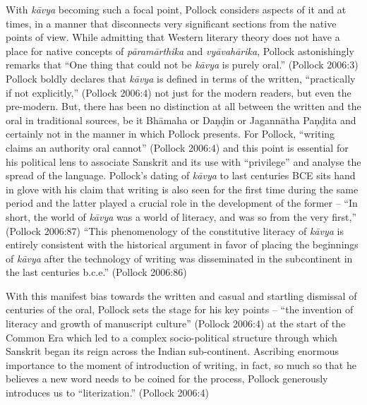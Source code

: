 With \textit{kāvya} becoming such a focal point, Pollock considers aspects of it and at times, in a manner that disconnects very significant sections from the native points of view. While admitting that Western literary theory does not have a place for native concepts of \textit{pāramārthika} and \textit{vyāvahārika}, Pollock astonishingly remarks that “One thing that could not be \textit{kāvya} is purely oral.” (Pollock 2006:3) Pollock boldly declares that \textit{kāvya} is defined in terms of the written, “practically if not explicitly,” (Pollock 2006:4) not just for the modern readers, but even the pre-modern. But, there has been no distinction at all between the written and the oral in traditional sources, be it Bhāmaha or Daṇḍin or Jagannātha Paṇḍita and certainly not in the manner in which Pollock presents. For Pollock, “writing claims an authority oral cannot” (Pollock 2006:4) and this point is essential for his political lens to associate Sanskrit and its use with “privilege” and analyse the spread of the language. Pollock’s dating of \textit{kāvya} to last centuries BCE sits hand in glove with his claim that writing is also seen for the first time during the same period and the latter played a crucial role in the development of the former – “In short, the world of \textit{kāvya} was a world of literacy, and was so from the very first,” (Pollock 2006:87) “This phenomenology of the constitutive literacy of \textit{kāvya} is entirely consistent with the historical argument in favor of placing the beginnings of \textit{kāvya} after the technology of writing was disseminated in the subcontinent in the last centuries b.c.e.” (Pollock 2006:86)

 With this manifest bias towards the written and casual and startling dismissal of centuries of the oral, Pollock sets the stage for his key points – “the invention of literacy and growth of manuscript culture” (Pollock 2006:4) at the start of the Common Era which led to a complex socio-political structure through which Sanskrit began its reign across the Indian sub-continent. Ascribing enormous importance to the moment of introduction of writing, in fact, so much so that he believes a new word needs to be coined for the process, Pollock generously introduces us to “literization.” (Pollock 2006:4)


